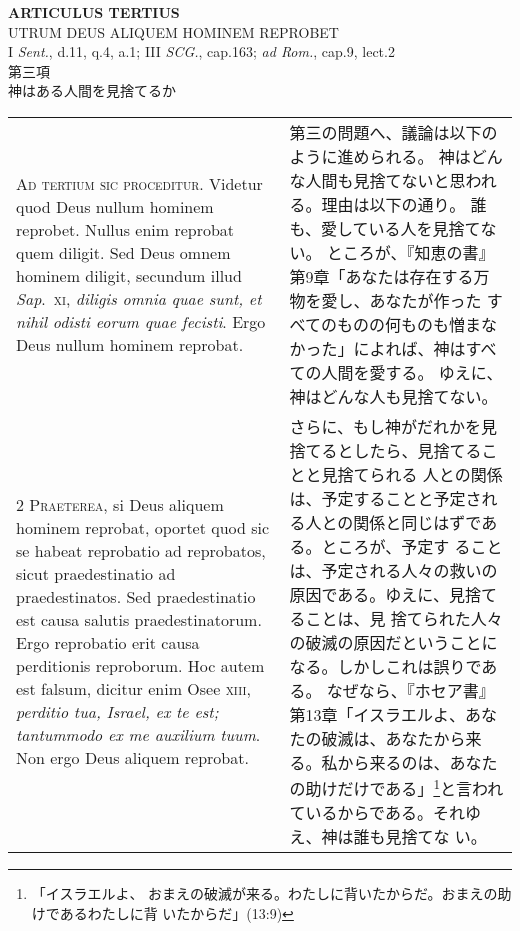 \documentclass[10pt]{jsarticle} %
\begin{document}
\begin{center}
 {\Large {\bf ARTICULUS TERTIUS}}\\
 {\large UTRUM DEUS ALIQUEM HOMINEM REPROBET}\\
 {\footnotesize I {\itshape Sent.}, d.11, q.4, a.1; III {\itshape SCG.},
 cap.163; {\itshape ad Rom.}, cap.9, lect.2}\\
 {\Large 第三項\\神はある人間を見捨てるか}
\end{center}

\begin{longtable}{p{21em}p{21em}}

{\Huge A}{\scshape d tertium sic proceditur}. Videtur quod
Deus nullum hominem reprobet. Nullus enim reprobat quem diligit. Sed
Deus omnem hominem diligit, secundum illud {\itshape Sap}.~{\scshape xi}, {\itshape diligis omnia quae
sunt, et nihil odisti eorum quae fecisti}. Ergo Deus nullum hominem
reprobat.


&

 第三の問題へ、議論は以下のように進められる。
 神はどんな人間も見捨てないと思われる。理由は以下の通り。
 誰も、愛している人を見捨てない。
 ところが、『知恵の書』第9章「あなたは存在する万物を愛し、あなたが作った
 すべてのものの何ものも憎まなかった」によれば、神はすべての人間を愛する。
 ゆえに、神はどんな人も見捨てない。
 

 
\\


{\scshape 2 Praeterea}, si Deus aliquem hominem
reprobat, oportet quod sic se habeat reprobatio ad reprobatos, sicut
praedestinatio ad praedestinatos. Sed praedestinatio est causa salutis
praedestinatorum. Ergo reprobatio erit causa perditionis reproborum. Hoc
autem est falsum, dicitur enim Osee {\scshape xiii}, {\itshape perditio tua, Israel, ex te
 est; tantummodo ex me auxilium tuum}. Non ergo Deus aliquem reprobat.

 &

さらに、もし神がだれかを見捨てるとしたら、見捨てることと見捨てられる
 人との関係は、予定することと予定される人との関係と同じはずである。ところが、予定す
 ることは、予定される人々の救いの原因である。ゆえに、見捨てることは、見
 捨てられた人々の破滅の原因だということになる。しかしこれは誤りである。
 なぜなら、『ホセア書』第13章「イスラエルよ、あなたの破滅は、あなたから来
 る。私から来るのは、あなたの助けだけである」\footnote{「イスラエルよ、
 おまえの破滅が来る。わたしに背いたからだ。おまえの助けであるわたしに背
 いたからだ」(13:9)}と言われているからである。それゆえ、神は誰も見捨てな
 い。
 

\end{longtable}
\end{document}
